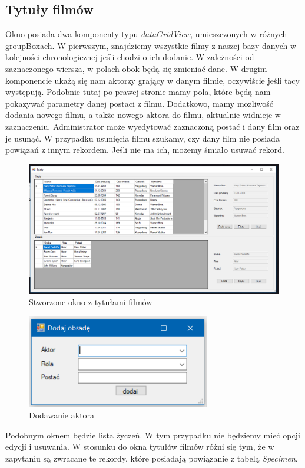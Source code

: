 \documentclass{article}
\begin{document}
\subsection{Tytuły filmów}
Okno posiada dwa komponenty typu \textit{dataGridView}, umieszczonych w różnych groupBoxach. W pierwszym, znajdziemy wszystkie filmy z naszej bazy danych w kolejności chronologicznej jeśli chodzi o ich dodanie. W zależności od zaznaczonego wiersza, w polach obok będą się zmieniać dane. W drugim komponencie ukażą się nam aktorzy grający w danym filmie, oczywiście jeśli tacy występują. Podobnie tutaj po prawej stronie mamy pola, które będą nam pokazywać parametry danej postaci z filmu. Dodatkowo, mamy możliwość dodania nowego filmu, a także nowego aktora do filmu, aktualnie widnieje w zaznaczeniu. Administrator może wyedytować zaznaczoną postać i dany film oraz je usunąć. W przypadku usunięcia filmu szukamy, czy dany film nie posiada powiązań z innym rekordem. Jeśli nie ma ich, możemy śmiało usuwać rekord. 
\begin{figure}[!ht]
\centering
\includegraphics[width=12.5cm]{tytuly.PNG}
\caption{Stworzone okno z tytułami filmów}
\end{figure}

\begin{figure}[!ht]
\centering
\includegraphics[width=8cm]{3a.PNG}
\caption{Dodawanie aktora}
\end{figure}
Podobnym oknem będzie lista życzeń. W tym przypadku nie będziemy mieć opcji edycji i usuwania. W stosunku do okna tytułów filmów różni się tym, że w zapytaniu są zwracane te rekordy, które posiadają powiązanie z tabelą \textit{Specimen}.
\end{document}
